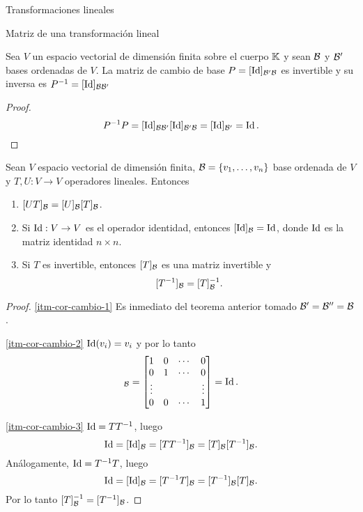 \begin{chapter}{Transformaciones lineales}
\begin{section}{Matriz de una transformaci\'on lineal}
        \begin{corolario}\label{cor-inversa-matriz-cambio-de-base} Sea $V$ un espacio vectorial de dimensión finita sobre el cuerpo $\mathbb K$ y sean $\mathcal{B}$ y $\mathcal{B}'$ bases ordenadas de $V$. La matriz de cambio de base  $P =[\operatorname{Id}]_{\mathcal{B}' \mathcal{B}}$ es invertible y su  inversa es $P^{-1} =[\operatorname{Id}]_{\mathcal{B} \mathcal{B}'}$
        \end{corolario}
        \begin{proof}
            \begin{equation*}
                P^{-1} P =[\operatorname{Id}]_{\mathcal{B} \mathcal{B}'}[\operatorname{Id}]_{\mathcal{B}' \mathcal{B}} = [\operatorname{Id}]_{\mathcal{B}'} = \operatorname{Id}.
            \end{equation*}
        \end{proof}
    

        \begin{corolario}\label{cor-5.6} Sean $V$ espacio vectorial de dimensión finita, $\mathcal{B} = \{v_1,\ldots,v_n\}$ base ordenada de $V$ y $T,U: V \to V$ operadores lineales. Entonces
            \begin{enumerate}
                \item\label{itm-cor-cambio-1} $[UT]_{\mathcal{B}} = [U]_{\mathcal{B}} [T]_{\mathcal{B}}$.
                \item\label{itm-cor-cambio-2} Si $\operatorname{Id}: V \to V$  es el operador identidad, entonces $[\operatorname{Id}]_{\mathcal{B}} =\operatorname{Id}$,  donde $\operatorname{Id}$  es la matriz identidad $n \times n$.
                \item\label{itm-cor-cambio-3} Si $T$  es invertible,  entonces $[T]_{\mathcal{B}}$  es una matriz invertible y  $$[T^{-1}]_{\mathcal{B}} = [T]_{\mathcal{B}}^{-1}.$$
            \end{enumerate}
        \end{corolario}
        \begin{proof}
            \ref{itm-cor-cambio-1} Es inmediato del teorema anterior tomado $\mathcal{B}' =\mathcal{B}'' = \mathcal{B}$. 
            
            \ref{itm-cor-cambio-2} $\operatorname{Id}(v_i) = v_i$ y por lo tanto
            \begin{equation*}
                [\Id]_{\cB} = \begin{bmatrix} 1&0&\cdots&0 \\0&1&\cdots&0\\\vdots&&&\vdots\\0&0&\cdots&1 	\end{bmatrix} = \Id.
            \end{equation*}
            
            
            \ref{itm-cor-cambio-3} $\operatorname{Id} = T T^{-1}$, luego
            \begin{equation*}
                \operatorname{Id} = [\operatorname{Id}]_{\mathcal{B}} =  [T T^{-1}]_{\mathcal{B}} =  [T]_{\mathcal{B}} [T^{-1}]_{\mathcal{B}}.
            \end{equation*}
             Análogamente, $\operatorname{Id} = T^{-1} T$, luego
            \begin{equation*}
            \operatorname{Id} = [\operatorname{Id}]_{\mathcal{B}} =  [T^{-1} T]_{\mathcal{B}} =  [T^{-1}]_{\mathcal{B}} [T]_{\mathcal{B}}. 
            \end{equation*}
            Por  lo tanto $[T]_{\mathcal{B}}^{-1} = [T^{-1}]_{\mathcal{B}}$.
        \end{proof}	
    

\end{section}
\end{chapter}
